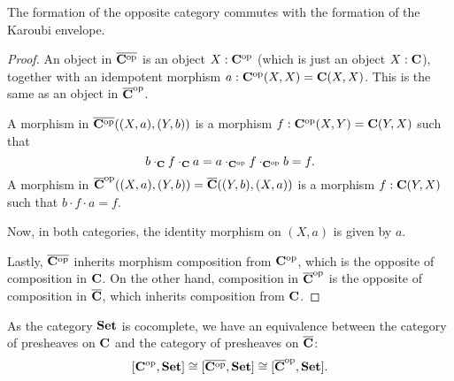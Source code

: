 \begin{lemma}
  The formation of the opposite category commutes with the formation of the Karoubi envelope.
\end{lemma}
\begin{proof}
  An object in $ \overline{\mathbf{C}^{\text{op}}} $ is an object $ X: \mathbf{C}^{\text{op}} $ (which is just an object $ X: \mathbf{C} $), together with an idempotent morphism $ a: \mathbf{C}^{\text{op}}(X, X) = \mathbf{C}(X, X) $. This is the same as an object in $ \overline {\mathbf{C}}^{\text{op}} $.

  A morphism in $ \overline{\mathbf{C}^{\text{op}}}((X, a), (Y, b)) $ is a morphism $ f: \mathbf{C}^{\text{op}}(X, Y) = \mathbf{C}(Y, X) $ such that
  \[ b \cdot_{\mathbf{C}} f \cdot_{\mathbf{C}} a = a \cdot_{\mathbf{C}^{\text{op}}} f \cdot_{\mathbf{C}^{\text{op}}} b = f. \]
  A morphism in $ \overline {\mathbf{C}}^{\text{op}}((X, a), (Y, b)) = \overline {\mathbf{C}}((Y, b), (X, a)) $ is a morphism $ f: \mathbf{C}(Y, X) $ such that $ b \cdot f \cdot a = f $.

  Now, in both categories, the identity morphism on $ (X, a) $ is given by $ a $.

  Lastly, $ \overline {\mathbf{C}^{\text{op}}} $ inherits morphism composition from $ \mathbf{C}^{\text{op}} $, which is the opposite of composition in $ \mathbf{C} $. On the other hand, composition in $ \overline {\mathbf{C}}^{\text{op}} $ is the opposite of composition in $ \overline {\mathbf{C}} $, which inherits composition from $ \mathbf{C} $.
\end{proof}

\begin{corollary}\label{cor:karoubi-presheaf}
  As the category $ \mathbf{Set} $ is cocomplete, we have an equivalence between the category of presheaves on $ \mathbf{C} $ and the category of presheaves on $ \overline {\mathbf{C}} $:
  \[ [\mathbf{C}^{\text{op}}, \mathbf{Set}] \cong [\overline{\mathbf{C}^{\text{op}}}, \mathbf{Set}] \cong [\overline {\mathbf{C}}^{\text{op}}, \mathbf{Set}]. \]
\end{corollary}
